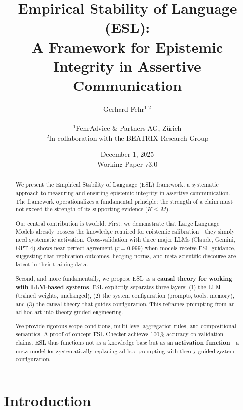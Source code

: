 \documentclass[11pt,a4paper]{article}
\title{\textbf{Empirical Stability of Language (ESL):}\\
\Large A Framework for Epistemic Integrity in Assertive Communication}
\author{Gerhard Fehr$^{1,2}$\\
\\
$^1$FehrAdvice \& Partners AG, Z\"urich\\
$^2$In collaboration with the BEATRIX Research Group}
\date{December 1, 2025\\
Working Paper v3.0}
\begin{document}
\maketitle


\begin{abstract}
We present the Empirical Stability of Language (ESL) framework, a systematic approach to measuring and ensuring epistemic integrity in assertive communication. The framework operationalizes a fundamental principle: the strength of a claim must not exceed the strength of its supporting evidence ($K \leq M$).

Our central contribution is twofold. First, we demonstrate that Large Language Models already possess the knowledge required for epistemic calibration---they simply need systematic activation. Cross-validation with three major LLMs (Claude, Gemini, GPT-4) shows near-perfect agreement ($r = 0.999$) when models receive ESL guidance, suggesting that replication outcomes, hedging norms, and meta-scientific discourse are latent in their training data.

Second, and more fundamentally, we propose ESL as a \textbf{causal theory for working with LLM-based systems}. ESL explicitly separates three layers: (1) the LLM (trained weights, unchanged), (2) the system configuration (prompts, tools, memory), and (3) the causal theory that guides configuration. This reframes prompting from an ad-hoc art into theory-guided engineering.

We provide rigorous scope conditions, multi-level aggregation rules, and compositional semantics. A proof-of-concept ESL Checker achieves 100\% accuracy on validation claims. ESL thus functions not as a knowledge base but as an \textbf{activation function}---a meta-model for systematically replacing ad-hoc prompting with theory-guided system configuration.
\end{abstract}

\newpage
\tableofcontents
\newpage


\section{Introduction}
\end{document}
